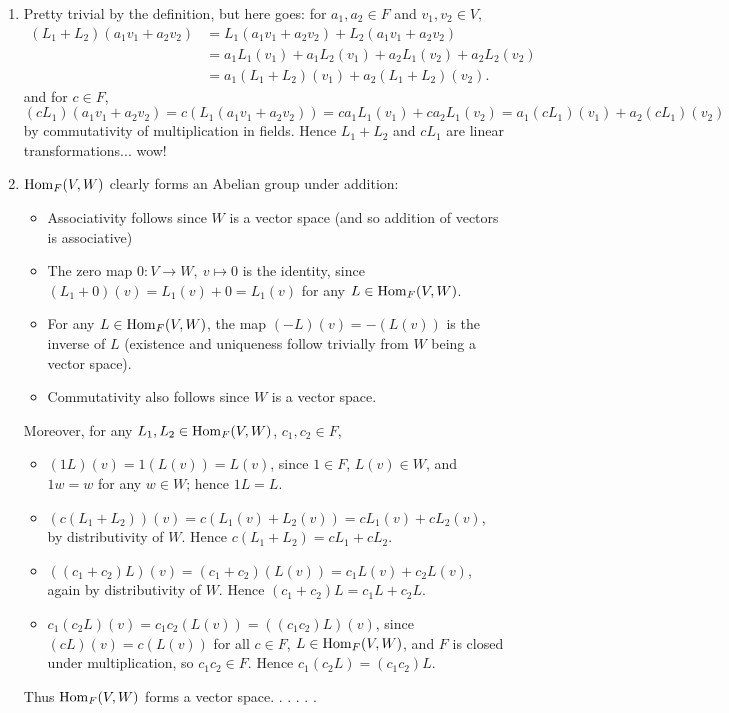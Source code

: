 \documentclass{homework}
\begin{document}
\begin{solution}
  \begin{enumerate}[label=(\alph*)]
    \item Pretty trivial by the definition, but here goes: for $a_1,a_2\in F$ and $v_1,v_2\in V$,
      \begin{align*}
        (L_1+L_2)(a_1v_1+a_2v_2)&=L_1(a_1v_1+a_2v_2)+L_2(a_1v_1+a_2v_2)\\
          &=a_1L_1(v_1)+a_1L_2(v_1)+ a_2L_1(v_2)+a_2L_2(v_2)\\
          &=a_1(L_1+L_2)(v_1)+a_2(L_1+L_2)(v_2)
      .\end{align*}
       and for $c\in F$, \[
        (cL_1)(a_1v_1+a_2v_2)=c(L_1(a_1v_1+a_2v_2))=ca_1L_1(v_1)+ca_2L_1(v_2)=a_1(cL_1)(v_1)+a_2(cL_1)(v_2)
      \] by commutativity of multiplication in fields. Hence $L_1+L_2$ and $cL_1$ are linear
      transformations... wow!
    \item $\operatorname{Hom}_F(V,W)$ clearly forms an Abelian group under addition:
      \begin{itemize}
        \item Associativity follows since $W$ is a vector space (and so addition of vectors is
          associative)
        \item The zero map $0:V\to W,\ v\mapsto 0$ is the identity, since
          $(L_1+0)(v)=L_1(v)+0=L_1(v)$ for any $L\in \operatorname{Hom}_F(V,W)$.
        \item For any $L\in \operatorname{Hom}_F(V,W)$, the map $(-L)(v)=-(L(v))$ is the inverse of $L$ (existence
          and uniqueness follow trivially from $W$ being a vector space).
        \item Commutativity also follows since $W$ is a vector space.
      \end{itemize}
      Moreover, for any $L_1,L_2\in \operatorname{Hom}_F(V,W)$, $c_1,c_2\in F$, 
      \begin{itemize}
        \item $(1L)(v)=1(L(v))=L(v)$, since $1\in F$, $L(v)\in W$, and $1w=w$ for any $w\in W$;
          hence $1L=L$.
        \item $(c(L_1+L_2))(v)=c(L_1(v)+L_2(v))=cL_1(v)+cL_2(v)$, by distributivity of $W$. Hence
          $c(L_1+L_2)=cL_1+cL_2$.
        \item $((c_1+c_2)L)(v)=(c_1+c_2)(L(v))=c_1L(v)+c_2L(v)$, again by distributivity of $W$.
          Hence $(c_1+c_2)L=c_1L+c_2L$.
        \item $c_1(c_2L)(v)=c_1c_2(L(v))=((c_1c_2)L)(v)$, since $(cL)(v)=c(L(v))$ for all $c\in F$,
          $L\in \operatorname{Hom}_F(V,W)$, and $F$ is closed under multiplication, so $c_1c_2\in F$. Hence
          $c_1(c_2L)=(c_1c_2)L$.
      \end{itemize}
      Thus $\operatorname{Hom}_F(V,W)$ forms a vector space. . . . . .
  \end{enumerate}
\end{solution}
\end{document}
